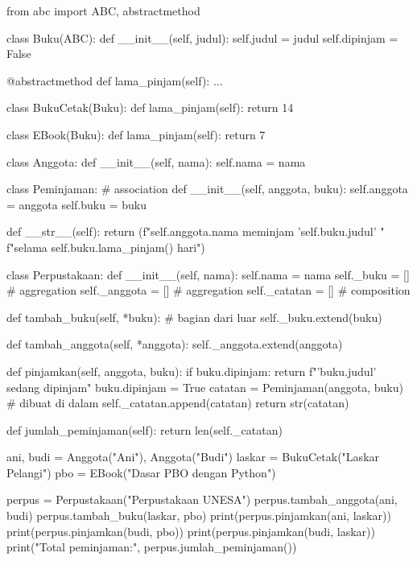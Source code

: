 \begin{kode}[perpustakaan.py]
from abc import ABC, abstractmethod

class Buku(ABC):
    def __init__(self, judul):
        self.judul = judul
        self.dipinjam = False

    @abstractmethod
    def lama_pinjam(self):
        ...

class BukuCetak(Buku):
    def lama_pinjam(self):
        return 14

class EBook(Buku):
    def lama_pinjam(self):
        return 7

class Anggota:
    def __init__(self, nama):
        self.nama = nama

class Peminjaman:                                  # association
    def __init__(self, anggota, buku):
        self.anggota = anggota
        self.buku = buku

    def __str__(self):
        return (f"{self.anggota.nama} meminjam '{self.buku.judul}' "
                f"selama {self.buku.lama_pinjam()} hari")

class Perpustakaan:
    def __init__(self, nama):
        self.nama = nama
        self._buku = []                            # aggregation
        self._anggota = []                         # aggregation
        self._catatan = []                         # composition

    def tambah_buku(self, *buku):                 # bagian dari luar
        self._buku.extend(buku)

    def tambah_anggota(self, *anggota):
        self._anggota.extend(anggota)

    def pinjamkan(self, anggota, buku):
        if buku.dipinjam:
            return f"'{buku.judul}' sedang dipinjam"
        buku.dipinjam = True
        catatan = Peminjaman(anggota, buku)        # dibuat di dalam
        self._catatan.append(catatan)
        return str(catatan)

    def jumlah_peminjaman(self):
        return len(self._catatan)

ani, budi = Anggota("Ani"), Anggota("Budi")
laskar = BukuCetak("Laskar Pelangi")
pbo = EBook("Dasar PBO dengan Python")

perpus = Perpustakaan("Perpustakaan UNESA")
perpus.tambah_anggota(ani, budi)
perpus.tambah_buku(laskar, pbo)
print(perpus.pinjamkan(ani, laskar))
print(perpus.pinjamkan(budi, pbo))
print(perpus.pinjamkan(budi, laskar))
print("Total peminjaman:", perpus.jumlah_peminjaman())
\end{kode}


